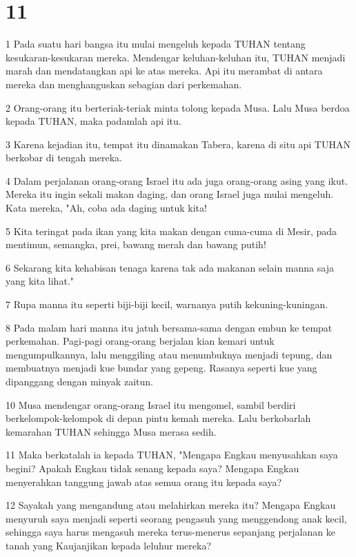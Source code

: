 \chapter{11}

\par 1 Pada suatu hari bangsa itu mulai mengeluh kepada TUHAN tentang kesukaran-kesukaran mereka. Mendengar keluhan-keluhan itu, TUHAN menjadi marah dan mendatangkan api ke atas mereka. Api itu merambat di antara mereka dan menghanguskan sebagian dari perkemahan.
\par 2 Orang-orang itu berteriak-teriak minta tolong kepada Musa. Lalu Musa berdoa kepada TUHAN, maka padamlah api itu.
\par 3 Karena kejadian itu, tempat itu dinamakan Tabera, karena di situ api TUHAN berkobar di tengah mereka.
\par 4 Dalam perjalanan orang-orang Israel itu ada juga orang-orang asing yang ikut. Mereka itu ingin sekali makan daging, dan orang Israel juga mulai mengeluh. Kata mereka, "Ah, coba ada daging untuk kita!
\par 5 Kita teringat pada ikan yang kita makan dengan cuma-cuma di Mesir, pada mentimun, semangka, prei, bawang merah dan bawang putih!
\par 6 Sekarang kita kehabisan tenaga karena tak ada makanan selain manna saja yang kita lihat."
\par 7 Rupa manna itu seperti biji-biji kecil, warnanya putih kekuning-kuningan.
\par 8 Pada malam hari manna itu jatuh bersama-sama dengan embun ke tempat perkemahan. Pagi-pagi orang-orang berjalan kian kemari untuk mengumpulkannya, lalu menggiling atau menumbuknya menjadi tepung, dan membuatnya menjadi kue bundar yang gepeng. Rasanya seperti kue yang dipanggang dengan minyak zaitun.
\par 10 Musa mendengar orang-orang Israel itu mengomel, sambil berdiri berkelompok-kelompok di depan pintu kemah mereka. Lalu berkobarlah kemarahan TUHAN sehingga Musa merasa sedih.
\par 11 Maka berkatalah ia kepada TUHAN, "Mengapa Engkau menyusahkan saya begini? Apakah Engkau tidak senang kepada saya? Mengapa Engkau menyerahkan tanggung jawab atas semua orang itu kepada saya?
\par 12 Sayakah yang mengandung atau melahirkan mereka itu? Mengapa Engkau menyuruh saya menjadi seperti seorang pengasuh yang menggendong anak kecil, sehingga saya harus mengasuh mereka terus-menerus sepanjang perjalanan ke tanah yang Kaujanjikan kepada leluhur mereka?
